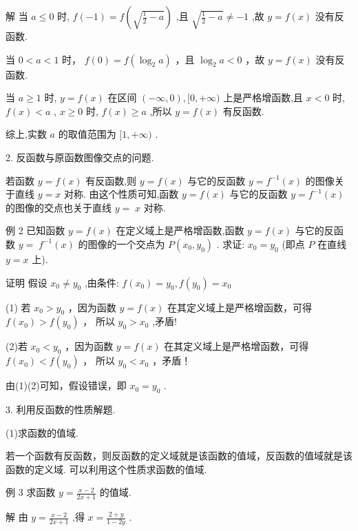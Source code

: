 \documentclass[10pt]{article}
\begin{document}
解 当 \(a \leq  0\) 时, \(f\left( {-1}\right)  = f\left( \sqrt{\frac{1}{2} - a}\right)\) ,且 \(\sqrt{\frac{1}{2} - a} \neq   - 1\) ,故 \(y = f\left( x\right)\) 没有反函数.

当 \(0 < a < 1\) 时， \(f\left( 0\right)  = f\left( {{\log }_{2}a}\right)\) ，且 \({\log }_{2}a < 0\) ，故 \(y = f\left( x\right)\) 没有反函数.

当 \(a \geq  1\) 时, \(y = f\left( x\right)\) 在区间 \(\left( {-\infty ,0}\right) ,\lbrack 0, + \infty )\) 上是严格增函数,且 \(x < 0\) 时, \(f\left( x\right)  < a\) , \(x \geq  0\) 时, \(f\left( x\right)  \geq  a\) ,所以 \(y = f\left( x\right)\) 有反函数.

综上,实数 \(a\) 的取值范围为 \(\lbrack 1, + \infty )\) .

2. 反函数与原函数图像交点的问题.

若函数 \(y = f\left( x\right)\) 有反函数,则 \(y = f\left( x\right)\) 与它的反函数 \(y = {f}^{-1}\left( x\right)\) 的图像关于直线 \(y = x\) 对称. 由这个性质可知,函数 \(y = f\left( x\right)\) 与它的反函数 \(y = {f}^{-1}\left( x\right)\) 的图像的交点也关于直线 \(y = \; x\) 对称.

例 2 已知函数 \(y = f\left( x\right)\) 在定义域上是严格增函数,函数 \(y = f\left( x\right)\) 与它的反函数 \(y = \; {f}^{-1}\left( x\right)\) 的图像的一个交点为 \(P\left( {{x}_{0},{y}_{0}}\right)\) . 求证: \({x}_{0} = {y}_{0}\) (即点 \(P\) 在直线 \(y = x\) 上).

证明 假设 \({x}_{0} \neq  {y}_{0}\) ,由条件: \(f\left( {x}_{0}\right)  = {y}_{0},f\left( {y}_{0}\right)  = {x}_{0}\)

(1) 若 \({x}_{0} > {y}_{0}\) ，因为函数 \(y = f\left( x\right)\) 在其定义域上是严格增函数，可得 \(f\left( {x}_{0}\right)  > f\left( {y}_{0}\right)\) ， 所以 \({y}_{0} > {x}_{0}\) ,矛盾!

(2)若 \({x}_{0} < {y}_{0}\) ，因为函数 \(y = f\left( x\right)\) 在其定义域上是严格增函数，可得 \(f\left( {x}_{0}\right)  < f\left( {y}_{0}\right)\) ， 所以 \({y}_{0} < {x}_{0}\) ，矛盾！

由(1)(2)可知，假设错误，即 \({x}_{0} = {y}_{0}\) .

3. 利用反函数的性质解题.

(1)求函数的值域.

若一个函数有反函数，则反函数的定义域就是该函数的值域，反函数的值域就是该函数的定义域. 可以利用这个性质求函数的值域.

例 3 求函数 \(y = \frac{x - 2}{{2x} + 1}\) 的值域.

解 由 \(y = \frac{x - 2}{{2x} + 1}\) ,得 \(x = \frac{2 + y}{1 - {2y}}\) .
\end{document}
